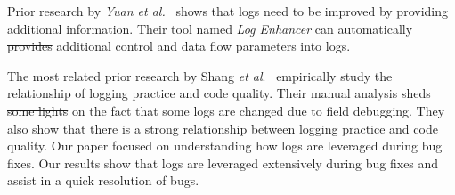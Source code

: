 \documentclass[conference]{IEEEtran}
\providecommand{\DIFadd}[1]{{\protect\color{blue}\uwave{#1}}} %
\providecommand{\DIFdel}[1]{{\protect\color{red}\sout{#1}}}                      %
\providecommand{\DIFaddbegin}{} %
\providecommand{\DIFaddend}{} %
\providecommand{\DIFdelbegin}{} %
\providecommand{\DIFdelend}{} %
\begin{document}
Prior research by \textsl{Yuan et al.}~\cite{Yuan} shows that logs need to be improved by providing additional information. Their tool named \emph{Log Enhancer} can automatically \DIFdelbegin \DIFdel{provides }\DIFdelend \DIFaddbegin \DIFadd{provide }\DIFaddend additional control and data flow parameters into logs. 

The most related prior research by Shang \emph{et al$.$}~\cite{EMSEIAN} empirically study the relationship of logging practice and code quality. Their manual analysis sheds \DIFdelbegin \DIFdel{some lights }\DIFdelend \DIFaddbegin \DIFadd{light }\DIFaddend on the fact that some logs are changed due to field debugging. They also show that there is a strong relationship between  logging practice and code quality. Our paper focused on understanding how logs are leveraged during bug fixes. Our results show that logs are  leveraged extensively during bug fixes and assist in a quick resolution of bugs. 






%
%
%


\end{document}
